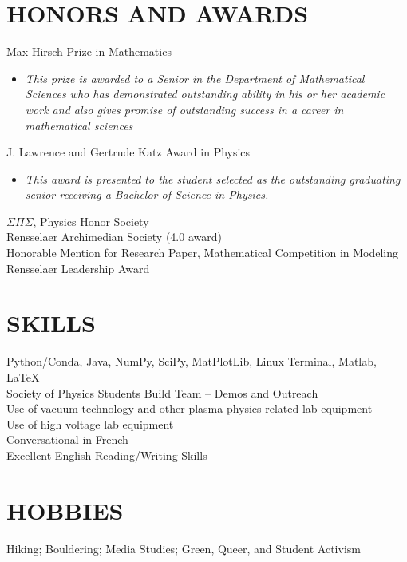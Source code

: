 \documentclass[margin]{rpires}
\begin{document}
\begin{resume}
\section{HONORS AND AWARDS} Max Hirsch Prize in Mathematics
                \begin{itemize}
                    \item[] {\sl This prize is awarded to a Senior in the Department of Mathematical Sciences who has demonstrated outstanding ability in his or her academic work and also gives promise of outstanding success in a career in mathematical sciences}
                \end{itemize}
                \vspace{-0.4cm}
                J. Lawrence and Gertrude Katz Award in Physics
                \begin{itemize} 
                    \item[] {\sl This award is presented to the student selected as the outstanding graduating senior receiving a Bachelor of Science in Physics.}
                \end{itemize}
                \vspace{-0.4cm}
                $\Sigma \Pi \Sigma$, Physics Honor Society \\
                Rensselaer Archimedian Society (4.0 award) \\
                Honorable Mention for Research Paper,       Mathematical Competition in Modeling \\
                Rensselaer Leadership Award 
 
\section{SKILLS}
Python/Conda, Java, NumPy, SciPy, MatPlotLib, Linux Terminal, Matlab, \LaTeX\\
Society of Physics Students Build Team – Demos and Outreach \\
Use of vacuum technology and other plasma physics related lab equipment\\
Use of high voltage lab equipment\\
Conversational in French\\
Excellent English Reading/Writing Skills \\

 
\section{HOBBIES}
Hiking; Bouldering; Media Studies; Green, Queer, and Student Activism
 
\end{resume} 
\end{document}
